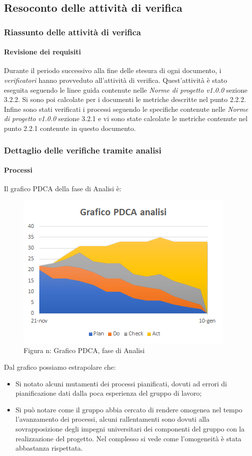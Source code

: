 \subsection{Resoconto delle attività di verifica}
\subsubsection{Riassunto delle attività di verifica}
\paragraph{Revisione dei requisiti}
Durante il periodo successivo alla fine delle stesura di ogni documento, i \emph{verificatori}  hanno provveduto all'attività di verifica. Quest'attività è stato eseguita seguendo le linee guida contenute nelle \emph{Norme di progetto v1.0.0} sezione 3.2.2.
Si sono poi calcolate per i documenti le metriche descritte nel punto 2.2.2.
Infine sono stati verificati i processi seguendo le specifiche contenute nelle \emph{Norme di progetto v1.0.0} sezione 3.2.1 e vi sono state calcolate le metriche contenute nel punto 2.2.1 contenute in questo documento.
\subsubsection{Dettaglio delle verifiche tramite analisi}
\paragraph{Processi}
Il grafico PDCA della fase di Analisi è:
\begin{figure} [H]
	\centering
	\includegraphics[scale=1]{Img/Grafico_PDCA}
	\caption{Figura n: Grafico PDCA, fase di Analisi}\label{}
\end{figure}
Dal grafico possiamo estrapolare che:
\begin{itemize}
	\item Si notato alcuni mutamenti dei processi pianificati, dovuti ad errori di pianificazione dati dalla poca esperienza del gruppo di lavoro;
	\item Si può notare come il gruppo abbia cercato di rendere omogenea nel tempo l'avanzamento dei processi, alcuni rallentamenti sono dovuti alla sovrapposizione degli impegni
	universitari dei componenti del gruppo con la realizzazione del progetto. Nel complesso si vede come l'omogeneità è stata abbastanza rispettata.
\end{itemize}
